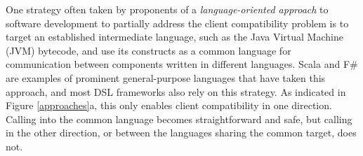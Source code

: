 One strategy often taken by proponents of a \emph{language-oriented approach} to software development \cite{journals/stp/Ward94} to partially address the client compatibility problem is to  target an established intermediate language, such as the Java Virtual Machine (JVM) bytecode, and use its constructs as a common language for communication between components written in different languages. Scala \cite{200464/IC} and F\# \cite{pickering2007foundations} are examples of prominent general-purpose languages that have taken this approach, and most DSL frameworks also rely on this strategy. As indicated in Figure \ref{approaches}a, this only enables client compatibility in one direction. Calling into the common language becomes straightforward and safe, but calling in the other direction, or between the languages sharing the common target, does not. 

